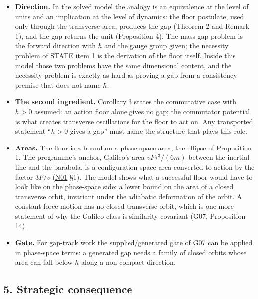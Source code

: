 \documentclass[11pt,a4paper]{article}
\newcommand{\tightlist}{\setlength{\itemsep}{0pt}\setlength{\parskip}{0pt}}
\begin{document}
\begin{itemize}
\tightlist
\item
  \textbf{Direction.} In the solved model the analogy is an equivalence
  at the level of units and an implication at the level of dynamics: the
  floor postulate, used only through the transverse area, produces the
  gap (Theorem 2 and Remark 1), and the gap returns the unit
  (Proposition 4). The mass-gap problem is the forward direction with
  \(\hbar\) and the gauge group given; the necessity problem of STATE
  item 1 is the derivation of the floor itself. Inside this model those
  two problems have the same dimensional content, and the necessity
  problem is exactly as hard as proving a gap from a consistency premise
  that does not name \(\hbar\).
\item
  \textbf{The second ingredient.} Corollary 3 states the commutative
  case with \(h>0\) assumed: an action floor alone gives no gap; the
  commutator potential is what creates transverse oscillations for the
  floor to act on. Any transported statement ``\(h>0\) gives a gap''
  must name the structure that plays this role.
\item
  \textbf{Areas.} The floor is a bound on a phase-space area, the
  ellipse of Proposition 1. The programme's anchor, Galileo's area
  \(vF\tau^3/(6m)\) between the inertial line and the parabola, is a
  configuration-space area converted to action by the factor \(3F/v\)
  (\href{newton-insertion-action.md}{N01} §1). The model shows what a
  successful floor would have to look like on the phase-space side: a
  lower bound on the area of a closed transverse orbit, invariant under
  the adiabatic deformation of the orbit. A constant-force motion has no
  closed transverse orbit, which is one more statement of why the
  Galileo class is similarity-covariant (G07, Proposition 14).
\item
  \textbf{Gate.} For gap-track work the supplied/generated gate of G07
  can be applied in phase-space terms: a generated gap needs a family of
  closed orbits whose area can fall below \(h\) along a non-compact
  direction.
\end{itemize}

\subsection{5. Strategic consequence}\label{strategic-consequence}
\end{document}
